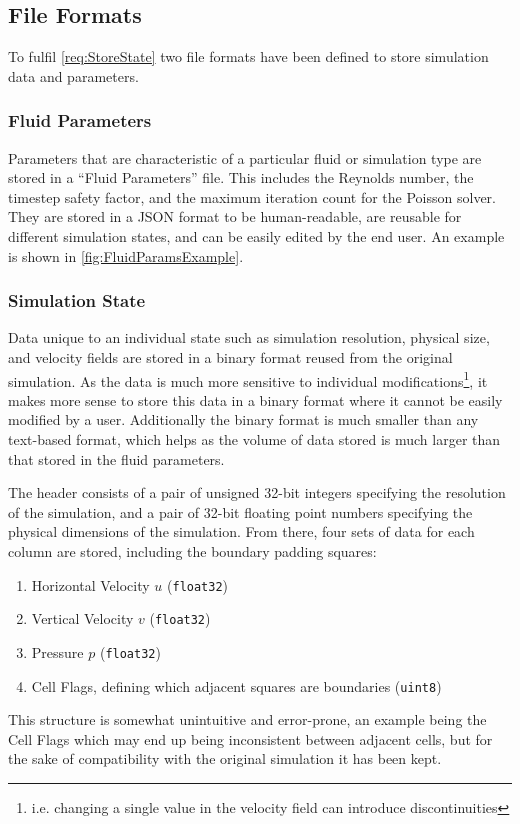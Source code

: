 \subsection{File Formats}\label{sec:FileFormat}
To fulfil \cref{req:StoreState} two file formats have been defined to store simulation data and parameters.

\subsubsection{Fluid Parameters}
Parameters that are characteristic of a particular fluid or simulation type are stored in a ``Fluid Parameters'' file.
This includes the Reynolds number, the timestep safety factor, and the maximum iteration count for the Poisson solver.
They are stored in a JSON format to be human-readable, are reusable for different simulation states, and can be easily edited by the end user.
An example is shown in \cref{fig:FluidParamsExample}.



\subsubsection{Simulation State}
Data unique to an individual state such as simulation resolution, physical size, and velocity fields are stored in a binary format reused from the original simulation.
As the data is much more sensitive to individual modifications\footnote{i.e. changing a single value in the velocity field can introduce discontinuities}, it makes more sense to store this data in a binary format where it cannot be easily modified by a user.
Additionally the binary format is much smaller than any text-based format, which helps as the volume of data stored is much larger than that stored in the fluid parameters.

The header consists of a pair of unsigned 32-bit integers specifying the resolution of the simulation, and a pair of 32-bit floating point numbers specifying the physical dimensions of the simulation.
From there, four sets of data for each column are stored, including the boundary padding squares:
\begin{enumerate}
    \item Horizontal Velocity $u$ (\texttt{float32})
    \item Vertical Velocity $v$ (\texttt{float32})
    \item Pressure $p$ (\texttt{float32})
    \item Cell Flags, defining which adjacent squares are boundaries (\texttt{uint8})
\end{enumerate}
This structure is somewhat unintuitive and error-prone, an example being the Cell Flags which may end up being inconsistent between adjacent cells, but for the sake of compatibility with the original simulation it has been kept.
